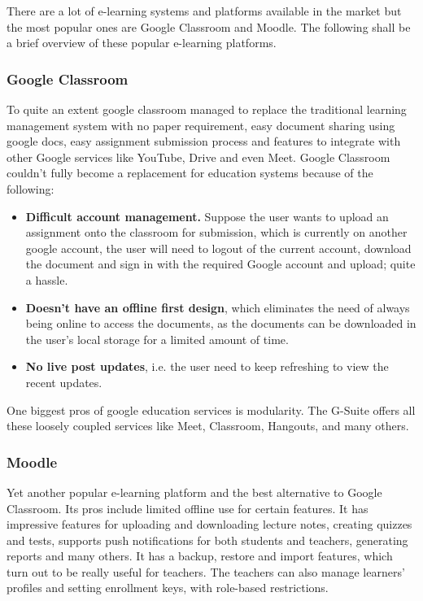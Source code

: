 There are a lot of e-learning systems and platforms available in the market 
but the most popular ones are Google Classroom and Moodle. 
The following shall be a brief overview of these popular e-learning platforms.

\subsubsection{Google Classroom}
To quite an extent google classroom managed to replace the traditional 
learning management system with no paper requirement, easy document sharing using google docs, 
easy assignment submission process and features to integrate with other Google services 
like YouTube, Drive and even Meet. 
Google Classroom couldn't fully become a replacement for education systems because of the following:

\begin{itemize}
    \item \textbf{Difficult account management.} Suppose the user wants to upload an assignment onto the classroom for submission, 
    which is currently on another google account, the user will need to logout of the current account, 
    download the document and sign in with the required Google account and upload; quite a hassle.
    \item \textbf{Doesn’t have an offline first design}, which eliminates the need of always being online to access the documents, 
    as the documents can be downloaded in the user’s local storage for a limited amount of time.
    \item \textbf{No live post updates}, i.e. the user need to keep refreshing to view the recent updates.
\end{itemize}

One biggest pros of google education services is modularity. The G-Suite offers all these 
loosely coupled services like Meet, Classroom, Hangouts, and many others.

\subsubsection{Moodle}
Yet another popular e-learning platform and the best alternative to Google Classroom. 
Its pros include limited offline use for certain features. It has impressive features 
for  uploading and downloading lecture notes, creating quizzes and tests, supports push 
notifications for both students and teachers, generating reports and many others. 
It has a  backup, restore and import features, which turn out to be really useful for teachers. 
The teachers can also manage learners' profiles and setting enrollment keys, with role-based restrictions.


